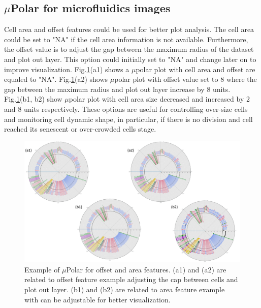 \documentclass[conference]{IEEEtran}
\begin{document}
\subsection{$\mu$Polar for microfluidics images}



Cell area and offset features could be used for better plot analysis. The cell area could be set to "NA" if the cell area information is not available. Furthermore, the offset value is to adjust the gap between the maximum radius of the dataset and plot out layer. This option could initially set to "NA" and change later on to improve visualization. Fig.\ref{fig:areaoff}(a1) shows a $\mu$polar plot with cell area and offset are equaled to "NA". Fig.\ref{fig:areaoff}(a2) shows $\mu$polar plot with offset value set to 8 where the gap between the maximum radius and plot out layer increase by 8 units. Fig.\ref{fig:areaoff}(b1, b2) show $\mu$polar plot with cell area size decreased and increased by 2 and 8 units respectively. These options are useful for controlling over-size cells and monitoring cell dynamic shape, in particular, if there is no division and cell reached its senescent or over-crowded cells stage.    

\begin{figure}
\centering
\includegraphics[width=\textwidth,height=10 cm]{Patterns/area_offset.pdf}
\caption{ Example of $\mu$Polar for offset and area features. (a1) and (a2) are related to offset feature example adjusting the cap between cells and plot out layer. (b1) and (b2) are related to area feature example with can be adjustable for better visualization.}
\label{fig:areaoff}
\end{figure}
\end{document}
